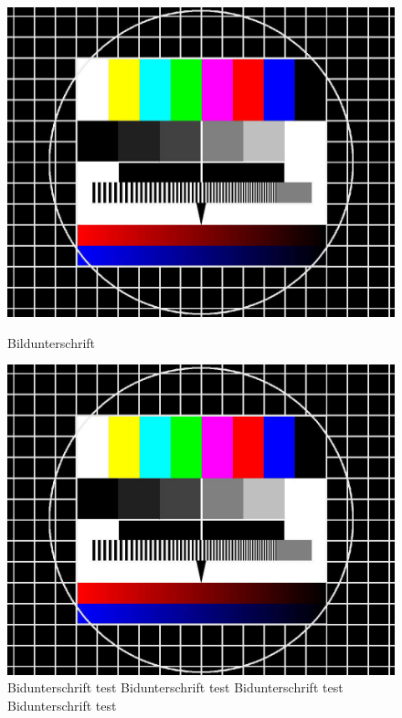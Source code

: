\begin{figure}[H]
	\centering
	\begin{minipage}[t]{0.48\textwidth}
		\includegraphics[width=\textwidth]{bilder/identifikation/testbild}
		\caption{Bildunterschrift}
		\label{fig:}
	\end{minipage}
	\hfill
	\begin{minipage}[t]{0.48\textwidth}
		\includegraphics[width=\textwidth]{bilder/identifikation/testbild}
		\caption{Bidunterschrift test Bidunterschrift test Bidunterschrift test Bidunterschrift test }
		\label{fig:}
	\end{minipage}
\end{figure}
























